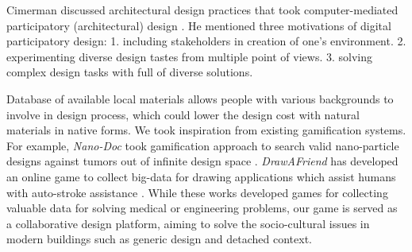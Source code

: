 Cimerman discussed architectural design practices that took computer-mediated participatory (architectural) design \cite{cimerman2000participatory}.
He mentioned three motivations of digital participatory design: 
1. including stakeholders in creation of one's environment. 
2. experimenting diverse design tastes from multiple point of views.
3. solving complex design tasks with full of diverse solutions.

Database of available local materials allows people with various backgrounds to involve in design process, which could lower the design cost with natural materials in native forms.
We took inspiration from existing gamification systems.
For example, \textit{Nano-Doc} took gamification approach to search valid nano-particle designs against tumors out of infinite design space \cite{hauertcrowdsourcing}.
\textit{DrawAFriend} has developed an online game to collect big-data for drawing applications which assist humans with auto-stroke assistance \cite{limpaecher2013real}.
While these works developed games for collecting valuable data for solving medical or engineering problems, our game is served as a collaborative design platform, aiming to solve the socio-cultural issues in modern buildings such as generic design and detached context.
